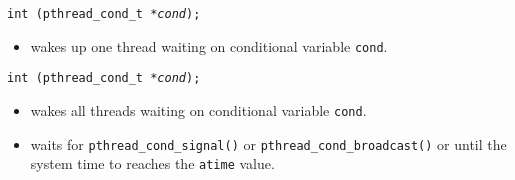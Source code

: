 

\begin{slide}
\prgchars
\texttt{int (pthread\_cond\_t *\emph{cond});}
\begin{itemize}
\item wakes up one thread waiting on conditional variable
\texttt{cond}.
\end{itemize}
\texttt{int (pthread\_cond\_t *\emph{cond});}
\begin{itemize}
\item wakes all threads waiting on conditional variable
\texttt{cond}.
\end{itemize}
\begin{itemize}
\item waits for \texttt{pthread\_cond\_signal()} or
\texttt{pthread\_cond\_broadcast()} or until the system time to reaches the
\texttt{atime} value.
\end{itemize}
\end{slide}

